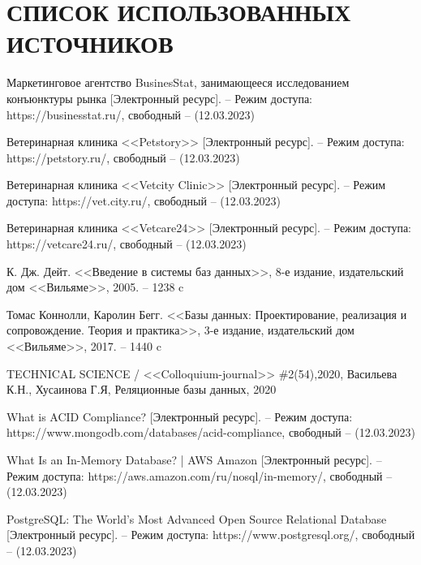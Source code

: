 \section*{СПИСОК ИСПОЛЬЗОВАННЫХ ИСТОЧНИКОВ}

\begingroup
\renewcommand{\section}[2]{}
\begin{thebibliography}{}
	
		Маркетинговое агентство  BusinesStat, занимающееся исследованием конъюнктуры рынка [Электронный ресурс]. -- Режим доступа: 
		https://businesstat.ru/,
		свободный -- (12.03.2023)
		
		Ветеринарная клиника <<Petstory>> [Электронный ресурс]. -- Режим доступа:  https://petstory.ru/,
		свободный -- (12.03.2023)
		
		Ветеринарная клиника <<Vetcity Clinic>> [Электронный ресурс]. -- Режим доступа:  https://vet.city.ru/,
		свободный -- (12.03.2023)
		
		Ветеринарная клиника <<Vetcare24>> [Электронный ресурс]. -- Режим доступа: https://vetcare24.ru/,
		свободный -- (12.03.2023)
			
		К. Дж. Дейт.
		<<Введение в системы баз данных>>, 8-е издание, издательский дом <<Вильяме>>,
		2005. -- 1238 c 
		
		Томас Коннолли, Каролин Бегг.
		<<Базы данных: Проектирование, реализация и сопровождение. Теория и практика>>, 3-е издание, издательский дом <<Вильяме>>,
		2017. -- 1440 c
		
		TECHNICAL SCIENCE / <<Colloquium-journal>> \#2(54),2020,
		Васильева К.Н., Хусаинова Г.Я,
		Реляционные базы данных,
		2020

		What is ACID Compliance? [Электронный ресурс]. -- Режим доступа: 	https://www.mongodb.com/databases/acid-compliance,
		свободный -- (12.03.2023)
		
		What Is an In-Memory Database? | AWS Amazon [Электронный ресурс]. -- Режим доступа: https://aws.amazon.com/ru/nosql/in-memory/,
		свободный -- (12.03.2023)
		
		PostgreSQL: The World's Most Advanced Open Source Relational Database  [Электронный ресурс]. -- Режим доступа: https://www.postgresql.org/,
		свободный -- (12.03.2023)
		

\end{thebibliography}
